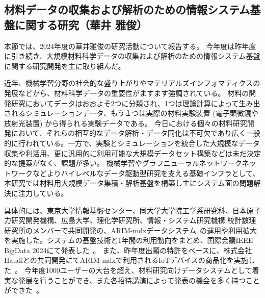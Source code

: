 \subsection{材料データの収集および解析のための情報システム基盤に関する研究（華井 雅俊）}

本節では、2024年度の華井雅俊の研究活動について報告する。
今年度は昨年度に引き続き、大規模材料科学データの収集および解析のための情報システム基盤に関する研究開発を主に取り組んだ。

近年、機械学習分野の社会的な盛り上がりやマテリアルズインフォマティクスの発展などから、材料科学データの重要性がますます強調されている。
材料の開発研究においてデータはおおよそ2つに分類され、1つは理論計算によって生み出されるシミュレーションデータ、もう１つは実際の材料実験装置 (電子顕微鏡や放射光装置) から得られる実験データである。
今日における個々の材料研究開発において、それらの相互的なデータ解析・データ同化は不可欠であり広く一般的に行われている。一方で、実験とシミュレーションを統合した大規模なデータ収集や利活用、更に汎用的に利用可能な大規模データセット構築などは未だ決定的な提案がなく、課題が多い。
機械学習やグラフニューラルネットワークネットワークなどよりハイレベルなデータ駆動型研究を支える基礎インフラとして、本研究では材料用大規模データ集積・解析基盤を構築し主にシステム面の問題解決に注力している。

具体的には、東京大学情報基盤センター、同大学大学院工学系研究科、日本原子力研究開発機構、広島大学、理化学研究所、情報・システム研究機構 統計数理研究所のメンバーで共同開発の、ARIM-mdxデータシステム~\cite{hanai-arim-mdx}の運用や利用拡大を実施した。システムの基盤技術と1年間の利用動向をまとめ、国際会議IEEE BigData 2024にて発表した~\cite{hanai-BigData,hanai-press}。
また、昨年度出願の特許をベースに、株式会社Haudiとの共同開発にてARIM-mdxで利用されるIoTデバイスの商品化を実施した~\cite{hanai-rxt}。
今年度1000ユーザーの大台を超え、材料研究向けデータシステムとして着実な発展を行うことができ、また各招待講演によって発表の機会を多く持つことができた~\cite{hanai-kyudai,hanai-akiba,hanai-simpo,hanai-mdx,hanai-nbci}。




